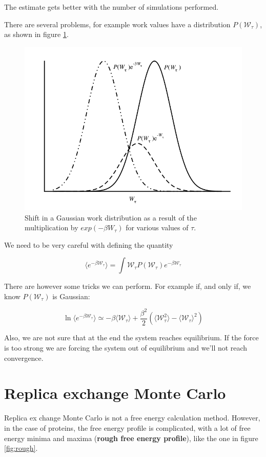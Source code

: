 The estimate gets better with the number of simulations performed. 

There are several problems, for example work values have a distribution $P(\mathcal{W}_\tau)$, as shown in figure \ref{fig:dist}.

\begin{figure}[H]
		\centering
		\includegraphics[scale=0.5]{dist}
		\caption{Shift in a Gaussian work distribution as a result of the multiplication by $exp(- \beta W_{\tau})$ for various values of $\tau$.}
		\label{fig:dist}
	\end{figure}	


We need to be very careful with defining the quantity 

$$\langle e^{-\beta\mathcal{W}_\tau}\rangle= \int\mathcal{W}_\tau P(\mathcal{W}_\tau)e^{-\beta\mathcal{W}_\tau}$$

There are however some tricks we can perform. For example if, and only if, we know $P(\mathcal{W}_\tau)$ is Gaussian:

$$\ln\langle e^{-\beta\mathcal{W}_\tau}\rangle\simeq-\beta\langle\mathcal{W}_\tau\rangle + \frac{\beta^2}{2}(\langle\mathcal{W}_\tau^2\rangle-\langle\mathcal{W}_\tau\rangle^2)$$

Also, we are not sure that at the end the system reaches equilibrium. 
If the force is too strong we are forcing the system out of equilibrium and we'll not reach convergence.

\section{Replica exchange Monte Carlo}
Replica ex change Monte Carlo is not a free energy calculation method.
However, in the case of proteins, the free energy profile is complicated, with a lot of free energy minima and maxima (\textbf{rough free energy profile}), like the one in figure \ref{fig:rough}.

